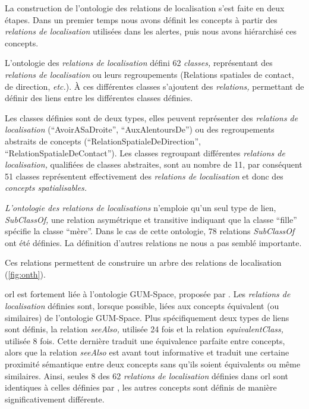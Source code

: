 La construction de l'ontologie des relations de localisation s'est
faite en deux étapes. Dans un premier temps nous avons définit les
concepts à partir des \emph{relations de localisation} utilisées dans
les alertes, puis nous avons hiérarchisé ces concepts.


L'ontologie des \emph{relations de localisation} défini 62
\emph{classes,} représentant des \emph{relations de localisation} ou
leurs regroupements (\eg Relations spatiales de contact, de direction,
\emph{etc.}). À ces différentes classes s'ajoutent des
\emph{relations,} permettant de définir des liens entre les
différentes classes définies.

Les classes définies sont de deux types, elles peuvent représenter des
\emph{relations de localisation} (\eg \enquote{AvoirASaDroite},
\enquote{AuxAlentoursDe}) ou des regroupements abstraits de concepts
(\eg \enquote{RelationSpatialeDeDirection},
\enquote{RelationSpatialeDeContact}). Les classes regroupant
différentes \emph{relations de localisation,} qualifiées de classes
abstraites, sont au nombre de 11, par conséquent 51 classes
représentent effectivement des \emph{relations de localisation} et
donc des \emph{concepts spatialisables.}

\emph{L'ontologie des relations de localisations} n'emploie qu'un seul
type de lien, \emph{SubClassOf,} une relation asymétrique et
transitive indiquant que la classe \enquote{fille} spécifie la classe
\enquote{mère}. Dans le cas de cette ontologie, 78 relations
\emph{SubClassOf} ont été définies. La définition d'autres relations
ne nous a pas semblé importante.

Ces relations permettent de
construire un arbre des relations de localisation
(\autoref{fig:onth}).


\ac{orl} est fortement liée à l'ontologie GUM-Space, proposée par
\textcite{Bateman2010}. Les \emph{relations de localisation} définies
sont, lorsque possible, liées aux concepts équivalent (ou similaires)
de l'ontologie GUM-Space. Plus spécifiquement deux types de liens sont
définis, la relation \emph{seeAlso,} utilisée 24 fois et la relation
\emph{equivalentClass,} utilisée 8 fois. Cette dernière traduit une
équivalence parfaite entre concepts, alors que la relation
\emph{seeAlso} est avant tout informative et traduit une certaine
proximité sémantique entre deux concepts sans qu'ils soient
équivalents ou même similaires. Ainsi, seules 8 des 62 \emph{relations
  de localisation} définies dans \ac{orl} sont identiques à celles
définies par \textcite{Bateman2010}, les autres concepts sont définis
de manière significativement différente.






